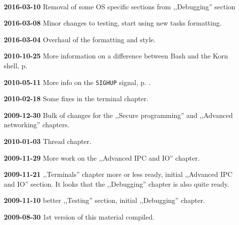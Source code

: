 
\newpage


\label{CHANGELOG}

~

{\footnotesize
\begin{itemize}
\item[{\bfseries 2016-03-10}] Removal of some OS specific sections from
,,Debugging'' section
\item[{\bfseries 2016-03-08}] Minor changes to testing, start using new tasks
formatting.
\item[{\bfseries 2016-03-04}] Overhaul of the formatting and style.
\item[{\bfseries 2010-10-25}] More information on a difference between Bash and
the Korn shell, p\pageref{BASH_KSH}.
\item[{\bfseries 2010-05-11}] More info on the \texttt{SIGHUP} signal, p.
\pageref{SIGHUP_SIGNAL}.
\item[{\bfseries 2010-02-18}] Some fixes in the terminal chapter.
\item[{\bfseries 2009-12-30}] Bulk of changes for the ,,Secure programming'' and
,,Advanced networking'' chapters.
\item[{\bfseries 2010-01-03}] Thread chapter.
\item[{\bfseries 2009-11-29}] More work on the ,,Advanced IPC and IO'' chapter.
\item[{\bfseries 2009-11-21}] ,,Terminals'' chapter more or less ready, initial
,,Advanced IPC and IO'' section. It looks that the ,,Debugging'' chapter is also
quite ready.
\item[{\bfseries 2009-11-10}] better ,,Testing'' section, initial ,,Debugging''
chapter.
\item[{\bfseries 2009-08-30}] 1st version of this material compiled.
\end{itemize}
}

\newpage

\endinput
